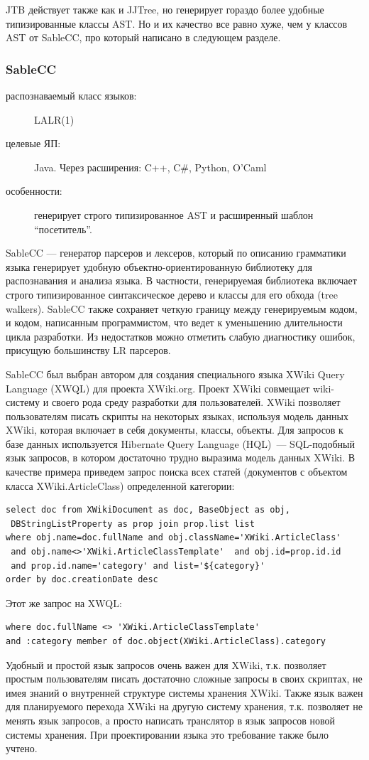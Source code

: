 \documentclass[a4paper,12pt,titlepage]{extarticle}
\begin{document}
JTB действует также как и JJTree, но генерирует гораздо более удобные
типизированные классы AST. Но и их качество все равно хуже, чем у классов AST от
SableCC, про который написано в следующем разделе.

\subsubsection*{SableCC}
\label{sablecc}
\begin{description}
  \item[распознаваемый класс языков:] LALR(1)
  \item[целевые ЯП:] Java. Через расширения: C++, C\#, Python, O'Caml
  \item[особенности:] генерирует строго типизированное AST и расширенный
 	шаблон ``посетитель''.
\end{description}

SableCC --- генератор парсеров и лексеров, который по описанию грамматики языка
генерирует удобную объектно-ориентированную библиотеку для распознавания
и анализа языка. В частности, генерируемая
библиотека включает строго типизированное синтаксическое дерево и классы для
его обхода (tree walkers). SableCC  также сохраняет четкую границу между
генерируемым кодом, и кодом, написанным программистом, что ведет к уменьшению
длительности цикла разработки. Из недостатков можно отметить слабую диагностику
ошибок, присущую большинству LR парсеров.

SableCC был выбран автором для создания специального языка XWiki Query Language
(XWQL) \cite{xwql} для проекта XWiki.org. Проект XWiki совмещает wiki-систему и
своего рода среду разработки для пользователей. XWiki позволяет пользователям
писать скрипты на некоторых языках, используя модель данных XWiki, которая
включает в себя документы, классы, объекты. Для запросов к базе данных
используется Hibernate Query Language (HQL)~--- SQL-подобный язык запросов, в
котором достаточно трудно выразима модель данных XWiki. В качестве примера
приведем запрос поиска всех статей (документов с объектом класса
XWiki.ArticleClass) определенной категории:
\begin{verbatim}
select doc from XWikiDocument as doc, BaseObject as obj, 
 DBStringListProperty as prop join prop.list list
where obj.name=doc.fullName and obj.className='XWiki.ArticleClass' 
 and obj.name<>'XWiki.ArticleClassTemplate'  and obj.id=prop.id.id
 and prop.id.name='category' and list='${category}'
order by doc.creationDate desc
\end{verbatim}
Этот же запрос на XWQL:
\begin{verbatim}
where doc.fullName <> 'XWiki.ArticleClassTemplate' 
and :category member of doc.object(XWiki.ArticleClass).category
\end{verbatim}
Удобный и простой язык запросов очень важен для XWiki, т.к. позволяет простым
пользователям писать достаточно сложные запросы в своих скриптах, не имея
знаний о внутренней структуре системы хранения XWiki. Также язык важен для
планируемого перехода XWiki на другую систему хранения, т.к. позволяет не менять
язык запросов, а просто написать транслятор в язык запросов новой системы
хранения. При проектировании языка это требование также было учтено.
\end{document}
